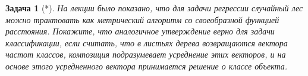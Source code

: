 \documentclass[12pt,fleqn]{article}
\newtheorem{esProblem}{Задача}
\begin{document}
    \begin{esProblem}[*]
	На лекции было показано, что для задачи регрессии случайный лес можно трактовать как метрический алгоритм со своеобразной функцией расстояния. Покажите, что аналогичное утверждение верно для задачи классификации, если считать, что в листьях дерева возвращаются вектора частот классов, композиция подразумевает усреднение этих векторов, и на основе этого усредненного вектора принимается решение о классе объекта.
	
\end{esProblem}
\end{document}
